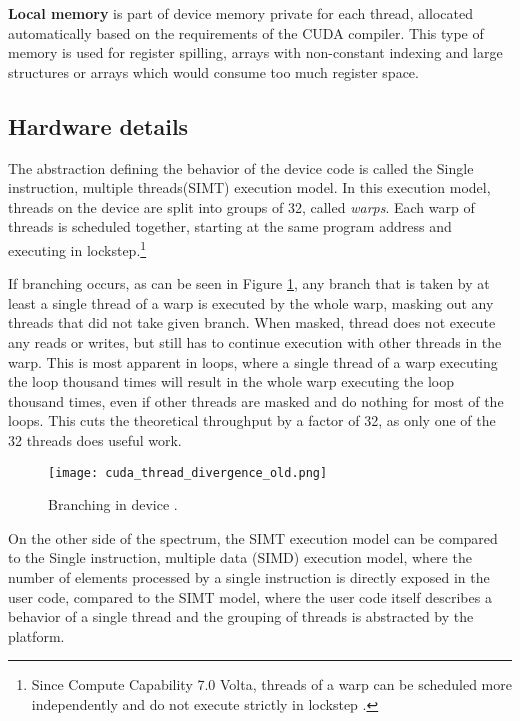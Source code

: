 \textbf{Local memory} is part of device memory private for each thread, allocated automatically based on the requirements of the CUDA compiler. This type of memory is used for register spilling, arrays with non-constant indexing and large structures or arrays which would consume too much register space. 


\subsection{Hardware details}
\label{sec:hardware_details}
The abstraction defining the behavior of the device code is called the Single instruction, multiple threads(SIMT) execution model. In this execution model, threads on the device are split into groups of 32, called \textit{warps}. Each warp of threads is scheduled together, starting at the same program address and executing in lockstep.\footnote{Since Compute Capability 7.0 Volta, threads of a warp can be scheduled more independently and do not execute strictly in lockstep \citep{paper:volta}.}


If branching occurs, as can be seen in Figure \ref{fig:thread_divergence_old}, any branch that is taken by at least a single thread of a warp is executed by the whole warp, masking out any threads that did not take given branch. When masked, thread does not execute any reads or writes, but still has to continue execution with other threads in the warp. This is most apparent in loops, where a single thread of a warp executing the loop thousand times will result in the whole warp executing the loop thousand times, even if other threads are masked and do nothing for most of the loops. This cuts the theoretical throughput by a factor of 32, as only one of the 32 threads does useful work.

\begin{figure}[ht]
	\centering
	\texttt{[image: cuda\_thread\_divergence\_old.png]}
	\caption{Branching in device \citep{site:cuda}.}
	\label{fig:thread_divergence_old}
\end{figure}

On the other side of the spectrum, the SIMT execution model can be compared to the Single instruction, multiple data (SIMD) execution model, where the number of elements processed by a single instruction is directly exposed in the user code, compared to the SIMT model, where the user code itself describes a behavior of a single thread and the grouping of threads is abstracted by the platform. 

